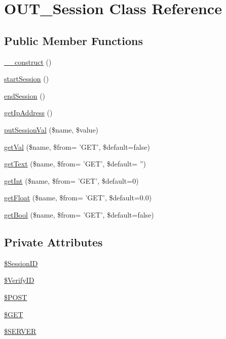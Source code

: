 \hypertarget{classOUT__Session}{
\section{OUT\_\-Session Class Reference}
\label{d6/d75/classOUT__Session}
}
\subsection*{Public Member Functions}
\begin{DoxyCompactItemize}
\item 
\hyperlink{classOUT__Session_a838ed9477ab542064af677e5cf97f276}{\_\-\_\-construct} ()
\item 
\hyperlink{classOUT__Session_ae753f4f970b7ef5701ca06eb8319755e}{startSession} ()
\item 
\hyperlink{classOUT__Session_a249eb4ce8b2f736a2282f9edf48c57fd}{endSession} ()
\item 
\hyperlink{classOUT__Session_a7dc75b2f274e8e8ecc0a43ebb94f8d7b}{getIpAddress} ()
\item 
\hyperlink{classOUT__Session_ae4af903f5997118f6036a4104ea20c3b}{putSessionVal} (\$name, \$value)
\item 
\hyperlink{classOUT__Session_af2c29620bc267a3613ec1f15ead5c519}{getVal} (\$name, \$from= 'GET', \$default=false)
\item 
\hyperlink{classOUT__Session_a455e243a97243d5585156a47fae04b27}{getText} (\$name, \$from= 'GET', \$default= '')
\item 
\hyperlink{classOUT__Session_a8df372b0cc4128399e6367f04c2219ab}{getInt} (\$name, \$from= 'GET', \$default=0)
\item 
\hyperlink{classOUT__Session_ada05962a25467070b6ca9ffa6692d4c3}{getFloat} (\$name, \$from= 'GET', \$default=0.0)
\item 
\hyperlink{classOUT__Session_a2000b816710ab8938ff33c21c05ff23e}{getBool} (\$name, \$from= 'GET', \$default=false)
\end{DoxyCompactItemize}
\subsection*{Private Attributes}
\begin{DoxyCompactItemize}
\item 
\hyperlink{classOUT__Session_a8a776002946743f759a9cd110aca0c43}{\$SessionID}
\item 
\hyperlink{classOUT__Session_ac04cf3c45479efcb55cc6310846dd77a}{\$VerifyID}
\item 
\hyperlink{classOUT__Session_abb034dc0d8a6fd5242974685313742cc}{\$POST}
\item 
\hyperlink{classOUT__Session_a34c08d712763261ab4a2efe76db27919}{\$GET}
\item 
\hyperlink{classOUT__Session_a257c5b20188e45a080a024ecba899883}{\$SERVER}
\end{DoxyCompactItemize}


